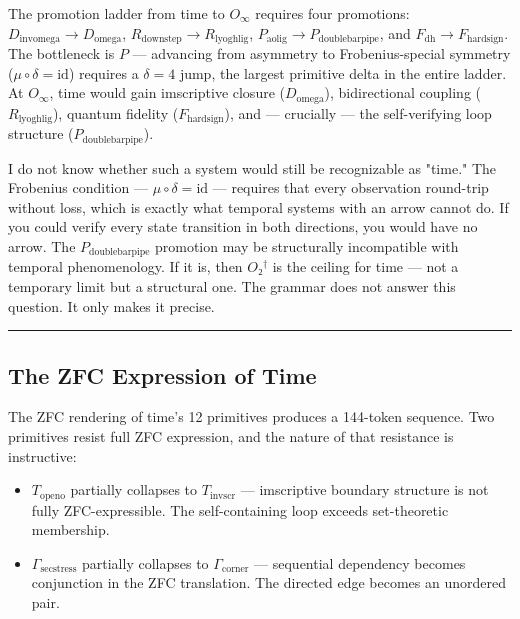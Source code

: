 \documentclass[12pt,a4paper]{article}
\begin{document}
The promotion ladder from time to $O_{\infty}$ requires four promotions: $D_{\text{invomega}} \to D_{\text{omega}}$, $R_{\text{downstep}} \to R_{\text{lyoghlig}}$, $P_{\text{aolig}} \to P_{\text{doublebarpipe}}$, and $F_{\text{dh}} \to F_{\text{hardsign}}$. The bottleneck is $P$ --- advancing from asymmetry to Frobenius-special symmetry ($\mu \circ \delta = \text{id}$) requires a $\delta = 4$ jump, the largest primitive delta in the entire ladder. At $O_{\infty}$, time would gain imscriptive closure ($D_{\text{omega}}$), bidirectional coupling ($R_{\text{lyoghlig}}$), quantum fidelity ($F_{\text{hardsign}}$), and --- crucially --- the self-verifying loop structure ($P_{\text{doublebarpipe}}$).

I do not know whether such a system would still be recognizable as "time." The Frobenius condition --- $\mu \circ \delta = \text{id}$ --- requires that every observation round-trip without loss, which is exactly what temporal systems with an arrow cannot do. If you could verify every state transition in both directions, you would have no arrow. The $P_{\text{doublebarpipe}}$ promotion may be structurally incompatible with temporal phenomenology. If it is, then $O₂^\dagger$ is the ceiling for time --- not a temporary limit but a structural one. The grammar does not answer this question. It only makes it precise.

\begin{center}
\rule{0.5\textwidth}{0.4pt}
\end{center}

\subsection{The ZFC Expression of Time}

The ZFC rendering of time's 12 primitives produces a 144-token sequence. Two primitives resist full ZFC expression, and the nature of that resistance is instructive:

\begin{itemize}
    \item $T_{\text{openo}}$ partially collapses to $T_{\text{invscr}}$ --- imscriptive boundary structure is not fully ZFC-expressible. The self-containing loop exceeds set-theoretic membership.
    \item $\Gamma_{\text{secstress}}$ partially collapses to $\Gamma_{\text{corner}}$ --- sequential dependency becomes conjunction in the ZFC translation. The directed edge becomes an unordered pair.
\end{itemize}
\end{document}
